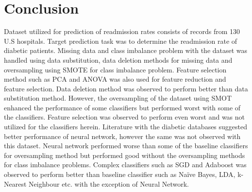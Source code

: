 \documentclass[conference]{IEEEtran}
\begin{document}
\section{Conclusion}

Dataset utilized for prediction of readmission rates consists of records from 130 U.S hospitals. Target prediction task was to determine the readmission rate of diabetic patients. Missing data and class imbalance problem with the dataset was handled using data substitution, data deletion methods for missing data and oversampling using SMOTE for class imbalance problem. Feature selection method such as PCA and ANOVA was also used for feature reduction and feature selection. Data deletion method was observed to perform better than data substitution method. However, the oversampling of the dataset using SMOT enhanced the performance of some classifiers but performed worst with some of the classifiers. Feature selection was observed to perform even worst and was not utilized for the classifiers herein. Literature with the diabetic databases suggested better performance of neural network, however the same was not observed with this dataset. Neural network performed worse than some of the baseline classifiers for oversampling method but performed good without the oversampling methods for class imbalance problems. Complex classifiers such as SGD and Adaboost was observed to perform better than baseline classifier such as Naïve Bayes, LDA, k-Nearest Neighbour etc. with the exception of Neural Network. 

\end{document}
